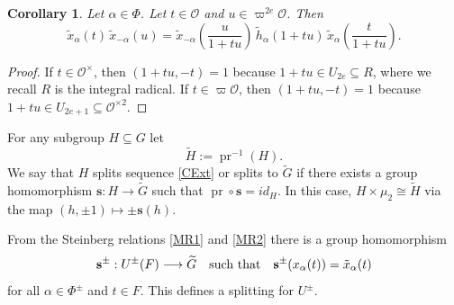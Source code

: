\documentclass[10pt, letterpaper]{amsart}
\theoremstyle{plain}
\newtheorem{Cor}[equation]{Corollary}
\theoremstyle{definition}
\numberwithin{equation}{section}
\newcommand{\pr}{\operatorname{pr}}
\newcommand{\xt}{\tilde{x}}
\newcommand{\htt}{\tilde{h}}
\newcommand{\Gt}{\widetilde{G}}
\newcommand{\s}{\mathbf{s}}
\newcommand{\Ocal}{\mathcal{O}}
\begin{document}
\begin{Cor}\label{PMRootSwapCor}
Let $\alpha\in \Phi$. Let $t\in\mathcal{O}$ and $u\in \varpi^{2e}\mathcal{O}$. Then
\begin{equation*}
		\xt_{\alpha}(t)\,\xt_{-\alpha}(u)=\xt_{-\alpha}(\frac{u}{1+tu})\,\htt_{\alpha}(1+tu)\,\xt_{\alpha}(\frac{t}{1+tu}).
\end{equation*}
\end{Cor}
\begin{proof}
If $t\in\mathcal{O}^{\times}$, then $(1+tu,-t)=1$ because $1+tu\in U_{2e}\subseteq R$, where we recall $R$ is the integral radical.  If $t\in\varpi \mathcal{O}$, then $(1+tu,-t)=1$ because $1+tu\in U_{2e+1}\subseteq\Ocal^{\times 2}$.
\end{proof}


For any subgroup $H\subseteq G$ let 
\[
\widetilde{H}:=\pr^{-1}(H).
\]
We say that $H$ splits sequence \eqref{CExt} or splits to $\Gt$ if there exists a group homomorphism $\s:H\rightarrow \widetilde{G}$ such that $\pr\circ \s=id_{H}$. In this case, $H\times \mu_{2}\cong \widetilde{H}$ via the map $(h,\pm1)\mapsto \pm\s(h)$. 

From the Steinberg relations \eqref{MR1} and \eqref{MR2} there is a group homomorphism 
\begin{equation}\label{E:section_for_unipotent_radical}
\s^{\pm}:U^{\pm}(F)\longrightarrow \Gt \text{\quad such that\quad} \s^{\pm}(x_{\alpha}(t))=\xt_{\alpha}(t)
\end{equation}
for all $\alpha\in\Phi^{\pm}$ and $t\in F$. This defines a splitting for $U^{\pm}$. 
\end{document}
